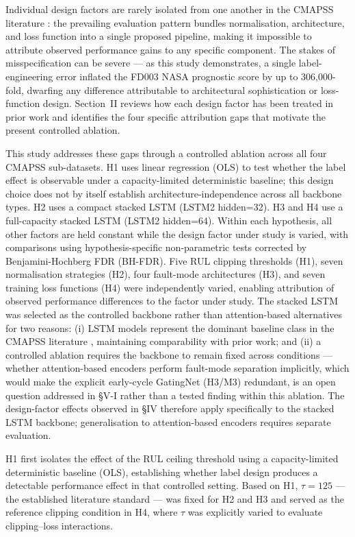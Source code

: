 \documentclass[review,12pt]{elsarticle}
\begin{document}
Individual design factors are rarely isolated from one another in the CMAPSS literature \cite{ref03,ref17}: the prevailing evaluation pattern bundles normalisation, architecture, and loss function into a single proposed pipeline, making it impossible to attribute observed performance gains to any specific component. The stakes of misspecification can be severe --- as this study demonstrates, a single label-engineering error inflated the FD003 NASA prognostic score by up to 306,000-fold, dwarfing any difference attributable to architectural sophistication or loss-function design. Section~II reviews how each design factor has been treated in prior work and identifies the four specific attribution gaps that motivate the present controlled ablation.

This study addresses these gaps through a controlled ablation across all four CMAPSS sub-datasets. H1 uses linear regression (OLS) to test whether the label effect is observable under a capacity-limited deterministic baseline; this design choice does not by itself establish architecture-independence across all backbone types. H2 uses a compact stacked LSTM (LSTM2 hidden=32). H3 and H4 use a full-capacity stacked LSTM (LSTM2 hidden=64). Within each hypothesis, all other factors are held constant while the design factor under study is varied, with comparisons using hypothesis-specific non-parametric tests corrected by Benjamini-Hochberg FDR (BH-FDR). Five RUL clipping thresholds (H1), seven normalisation strategies (H2), four fault-mode architectures (H3), and seven training loss functions (H4) were independently varied, enabling attribution of observed performance differences to the factor under study. The stacked LSTM was selected as the controlled backbone rather than attention-based alternatives for two reasons: (i) LSTM models represent the dominant baseline class in the CMAPSS literature \cite{ref05,ref06,ref09}, maintaining comparability with prior work; and (ii) a controlled ablation requires the backbone to remain fixed across conditions --- whether attention-based encoders perform fault-mode separation implicitly, which would make the explicit early-cycle GatingNet (H3/M3) redundant, is an open question addressed in \S{}V-I rather than a tested finding within this ablation. The design-factor effects observed in \S{}IV therefore apply specifically to the stacked LSTM backbone; generalisation to attention-based encoders requires separate evaluation.

H1 first isolates the effect of the RUL ceiling threshold using a capacity-limited deterministic baseline (OLS), establishing whether label design produces a detectable performance effect in that controlled setting. Based on H1, $\tau = 125$ --- the established literature standard \cite{ref05,ref06} --- was fixed for H2 and H3 and served as the reference clipping condition in H4, where $\tau$ was explicitly varied to evaluate clipping--loss interactions.
\end{document}
